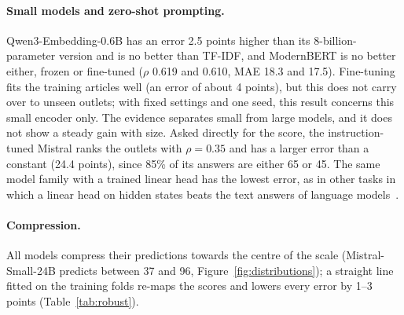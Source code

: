 \documentclass[11pt,a4paper]{article}
\begin{document}
\paragraph{Small models and zero-shot prompting.} Qwen3-Embedding-0.6B has an error 2.5 points higher than its
8-billion-parameter version and is no better than TF-IDF, and ModernBERT is no better either, frozen or fine-tuned
($\rho$ 0.619 and 0.610, MAE 18.3 and 17.5). Fine-tuning fits the training articles well (an error of about 4 points),
but this does not carry over to unseen outlets; with fixed settings and one seed, this result concerns this small
encoder only. The evidence separates small from large models, and it does not show a steady gain with size. Asked
directly for the score, the instruction-tuned Mistral ranks the outlets with $\rho = 0.35$ and has a larger error than a
constant (24.4 points), since 85\% of its answers are either 65 or 45. The same model family with a trained linear head
has the lowest error, as in other tasks in which a linear head on hidden states beats the text answers of language
models~\cite{buckmann2025revealing}.

\paragraph{Compression.} All models compress their predictions towards the centre of the scale (Mistral-Small-24B
predicts between 37 and 96, Figure~\ref{fig:distributions}); a straight line fitted on the training folds re-maps the scores
and lowers every error by 1--3 points (Table~\ref{tab:robust}).

\begin{table}[t]
\centering\small
\caption{Other checks of the error. Each row is a check and each column a model; the cells give the MAE per outlet
and, in parentheses, the difference from TF-IDF in the same row (negative: better than TF-IDF). The checks are
described in Appendix~\ref{app:robust}.}\label{tab:robust}
\end{table}
\end{document}
